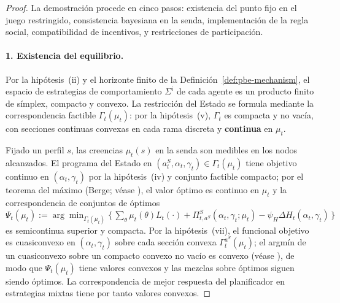 \documentclass[12pt]{article}
\providecommand{\textcite}{\citet}
\theoremstyle{definition}
\theoremstyle{remark}
\newcommand{\1}{\mathbf{1}}
\begin{document}
\begin{proof}
La demostración procede en cinco pasos: existencia del punto fijo en el juego restringido, consistencia bayesiana en la senda, implementación de la regla social, compatibilidad de incentivos, y restricciones de participación.

\paragraph{1. Existencia del equilibrio.}
Por la hipótesis~(ii) y el horizonte finito de la Definición~\ref{def:pbe-mechanism}, el espacio de estrategias de comportamiento $\Sigma^i$ de cada agente es un producto finito de símplex, compacto y convexo. La restricción del Estado se formula mediante la correspondencia factible $\Gamma_t(\mu_t)$: por la hipótesis~(v), $\Gamma_t$ es compacta y no vacía, con secciones continuas convexas en cada rama discreta y \textbf{continua} en $\mu_t$.

Fijado un perfil $s$, las creencias $\mu_t(s)$ en la senda son medibles en los nodos alcanzados. El programa del Estado en $(a_t^S,\alpha_t,\gamma_t)\in\Gamma_t(\mu_t)$ tiene objetivo continuo en $(\alpha_t,\gamma_t)$ por la hipótesis~(iv) y conjunto factible compacto; por el teorema del máximo \textup{(}Berge; véase \textcite{AliprantisBorder2006}\textup{)}, el valor óptimo es continuo en $\mu_t$ y la correspondencia de conjuntos de óptimos $\Psi_t(\mu_t):=\arg\min_{\Gamma_t(\mu_t)}\{\,\sum_{\theta}\mu_t(\theta)L_t(\cdot)+\Pi_{t,a^S}^S(\alpha_t,\gamma_t;\mu_t)-\psi_H\Delta H_t(\alpha_t,\gamma_t)\,\}$ es semicontinua superior y compacta. Por la hipótesis~(vii), el funcional objetivo es cuasiconvexo en $(\alpha_t,\gamma_t)$ sobre cada sección convexa $\Gamma_t^{a^S}(\mu_t)$; el argmín de un cuasiconvexo sobre un compacto convexo no vacío es convexo \textup{(}véase \textcite{AliprantisBorder2006}\textup{)}, de modo que $\Psi_t(\mu_t)$ tiene valores convexos y las mezclas sobre óptimos siguen siendo óptimos. La correspondencia de mejor respuesta del planificador en estrategias mixtas tiene por tanto valores convexos.


\end{proof}
\end{document}
